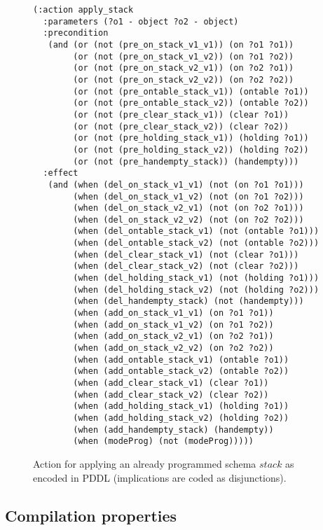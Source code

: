 \documentclass{article}
\begin{document}
\begin{figure}[hbt!]
\begin{scriptsize}
\begin{verbatim}
(:action apply_stack
  :parameters (?o1 - object ?o2 - object)
  :precondition
   (and (or (not (pre_on_stack_v1_v1)) (on ?o1 ?o1))
        (or (not (pre_on_stack_v1_v2)) (on ?o1 ?o2))
        (or (not (pre_on_stack_v2_v1)) (on ?o2 ?o1))
        (or (not (pre_on_stack_v2_v2)) (on ?o2 ?o2))
        (or (not (pre_ontable_stack_v1)) (ontable ?o1))
        (or (not (pre_ontable_stack_v2)) (ontable ?o2))
        (or (not (pre_clear_stack_v1)) (clear ?o1))
        (or (not (pre_clear_stack_v2)) (clear ?o2))
        (or (not (pre_holding_stack_v1)) (holding ?o1))
        (or (not (pre_holding_stack_v2)) (holding ?o2))
        (or (not (pre_handempty_stack)) (handempty)))
  :effect
   (and (when (del_on_stack_v1_v1) (not (on ?o1 ?o1)))
        (when (del_on_stack_v1_v2) (not (on ?o1 ?o2)))
        (when (del_on_stack_v2_v1) (not (on ?o2 ?o1)))
        (when (del_on_stack_v2_v2) (not (on ?o2 ?o2)))
        (when (del_ontable_stack_v1) (not (ontable ?o1)))
        (when (del_ontable_stack_v2) (not (ontable ?o2)))
        (when (del_clear_stack_v1) (not (clear ?o1)))
        (when (del_clear_stack_v2) (not (clear ?o2)))
        (when (del_holding_stack_v1) (not (holding ?o1)))
        (when (del_holding_stack_v2) (not (holding ?o2)))
        (when (del_handempty_stack) (not (handempty)))
        (when (add_on_stack_v1_v1) (on ?o1 ?o1))
        (when (add_on_stack_v1_v2) (on ?o1 ?o2))
        (when (add_on_stack_v2_v1) (on ?o2 ?o1))
        (when (add_on_stack_v2_v2) (on ?o2 ?o2))
        (when (add_ontable_stack_v1) (ontable ?o1))
        (when (add_ontable_stack_v2) (ontable ?o2))
        (when (add_clear_stack_v1) (clear ?o1))
        (when (add_clear_stack_v2) (clear ?o2))
        (when (add_holding_stack_v1) (holding ?o1))
        (when (add_holding_stack_v2) (holding ?o2))
        (when (add_handempty_stack) (handempty))
        (when (modeProg) (not (modeProg)))))
\end{verbatim}
\end{scriptsize}
 \caption{\small Action for applying an already programmed schema $stack$ as encoded in PDDL (implications are coded as disjunctions).}
\label{fig:compilation}
\end{figure}


\subsection{Compilation properties}
\end{document}
